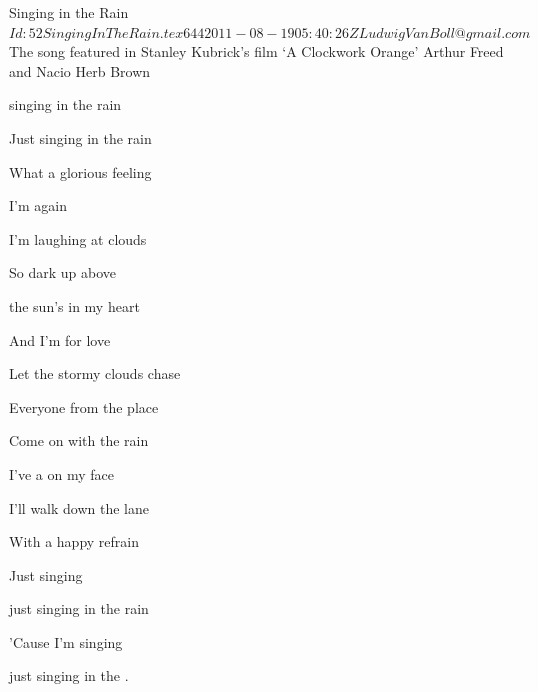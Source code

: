 \begin{SBSong}{Singing in the Rain}
  {$Id: 52SingingInTheRain.tex 644 2011-08-19 05:40:26Z LudwigVanBoll@gmail.com $}
  {The song featured in Stanley Kubrick's film `A Clockwork Orange'}
  {Arthur Freed and Nacio Herb Brown}
  \begin{SBVerse}
	 singing in the rain
	
	Just singing in the rain
	
	What a glorious feeling
	
	I'm  again

	I'm laughing at clouds
	
	So dark up above
	
	the sun's in my heart
	
	And I'm  for love

	Let the stormy clouds chase
	
	Everyone from the place
	
	Come on with the rain
	
	I've a  on my face

	I'll walk down the lane
	
	With a happy refrain
	
	Just singing
	
	just singing in the rain

	'Cause I'm singing
	
	just singing in the .
  \end{SBVerse}
\end{SBSong}
  